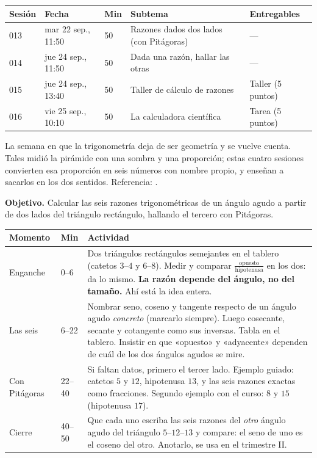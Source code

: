 \documentclass[11pt]{article}
\begin{document}
\encabezado*

\begin{center}
{\renewcommand{\arraystretch}{1.3}
\begin{tabularx}{\linewidth}{@{}l l l X l@{}}
  \toprule
  \textbf{Sesión} & \textbf{Fecha} & \textbf{Min} & \textbf{Subtema} & \textbf{Entregables}\\
  \midrule
  013 & mar 22 sep., 11:50 & 50 & Razones dados dos lados (con Pitágoras) & ---\\
  014 & jue 24 sep., 11:50 & 50 & Dada una razón, hallar las otras & ---\\
  015 & jue 24 sep., 13:40 & 50 & Taller de cálculo de razones & Taller (5 puntos)\\
  016 & vie 25 sep., 10:10 & 50 & La calculadora científica & Tarea (5 puntos)\\
  \bottomrule
\end{tabularx}}
\end{center}

La semana en que la trigonometría deja de ser geometría y se vuelve cuenta. Tales midió la
pirámide con una sombra y una proporción; estas cuatro sesiones convierten esa proporción en
seis números con nombre propio, y enseñan a sacarlos en los dos sentidos.
Referencia: .


\textbf{Objetivo.} Calcular las seis razones trigonométricas de un ángulo agudo a partir de
dos lados del triángulo rectángulo, hallando el tercero con Pitágoras.

\begin{center}
{\renewcommand{\arraystretch}{1.3}
\begin{tabularx}{\linewidth}{@{}l l X@{}}
  \toprule
  \textbf{Momento} & \textbf{Min} & \textbf{Actividad}\\
  \midrule
  Enganche & 0--6 & Dos triángulos rectángulos semejantes en el tablero (catetos $3$--$4$ y
    $6$--$8$). Medir y comparar $\frac{\text{opuesto}}{\text{hipotenusa}}$ en los dos: da
    lo mismo. \textbf{La razón depende del ángulo, no del tamaño.} Ahí está la idea entera.\\
  Las seis & 6--22 & Nombrar seno, coseno y tangente respecto de un ángulo agudo
    \emph{concreto} (marcarlo siempre). Luego cosecante, secante y cotangente como sus
    inversas. Tabla en el tablero. Insistir en que «opuesto» y «adyacente» dependen de cuál
    de los dos ángulos agudos se mire.\\
  Con Pitágoras & 22--40 & Si faltan datos, primero el tercer lado. Ejemplo guiado: catetos
    $5$ y $12$, hipotenusa $13$, y las seis razones exactas como fracciones. Segundo
    ejemplo con el curso: $8$ y $15$ (hipotenusa $17$).\\
  Cierre & 40--50 & Que cada uno escriba las seis razones del \emph{otro} ángulo agudo del
    triángulo $5$--$12$--$13$ y compare: el seno de uno es el coseno del otro. Anotarlo, se
    usa en el trimestre II.\\
  \bottomrule
\end{tabularx}}
\end{center}
\end{document}
